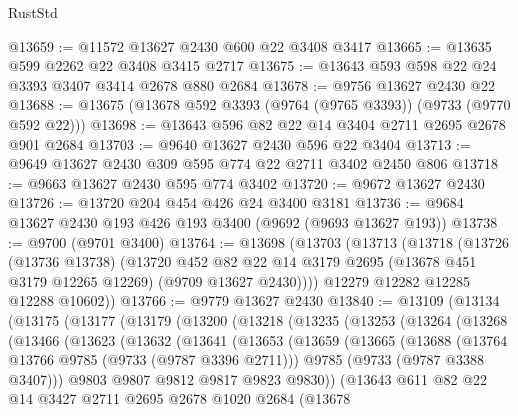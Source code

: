 \begin{lexlean}{RustStd}
\begin{coremodule}
{\begin{coremodule}
{{{{{{{{{{{{{{{{{{{{{{{{{{{{{{{{{{{{{{{{{{{{{{{{{{{{{{{@13659 := @11572 @13627 @2430 @600 @22 @3408 @3417
@13665 := @13635 @599 @2262 @22 @3408 @3415 @2717
@13675 := @13643 @593 @598 @22 @24 @3393 @3407 @3414 @2678 @880 @2684
@13678 := @9756 @13627 @2430 @22
@13688 := @13675 (@13678 @592 @3393 (@9764 (@9765 @3393)) (@9733 (@9770 @592 @22)))
@13698 := @13643 @596 @82 @22 @14 @3404 @2711 @2695 @2678 @901 @2684
@13703 := @9640 @13627 @2430 @596 @22 @3404
@13713 := @9649 @13627 @2430 @309 @595 @774 @22 @2711 @3402 @2450 @806
@13718 := @9663 @13627 @2430 @595 @774 @3402
@13720 := @9672 @13627 @2430
@13726 := @13720 @204 @454 @426 @24 @3400 @3181
@13736 := @9684 @13627 @2430 @193 @426 @193 @3400 (@9692 (@9693 @13627 @193))
@13738 := @9700 (@9701 @3400)
@13764 := @13698
    (@13703
      (@13713
        (@13718
          (@13726
            (@13736 @13738)
            (@13720
              @452
              @82
              @22
              @14
              @3179
              @2695
              (@13678 @451 @3179 @12265 @12269)
              (@9709 @13627 @2430))))
        @12279
        @12282
        @12285
        @12288
        @10602))
@13766 := @9779 @13627 @2430
@13840 := @13109
    (@13134
      (@13175
        (@13177
          (@13179
            (@13200
              (@13218
                (@13235
                  (@13253
                    (@13264
                      (@13268
                        (@13466
                          (@13623
                            (@13632
                              (@13641
                                (@13653
                                  (@13659
                                    (@13665
                                      (@13688
                                        (@13764 @13766 @9785 (@9733 (@9787 @3396 @2711)))
                                        @9785
                                        (@9733 (@9787 @3388 @3407)))
                                      @9803
                                      @9807
                                      @9812
                                      @9817
                                      @9823
                                      @9830))
                                  (@13643
                                    @611
                                    @82
                                    @22
                                    @14
                                    @3427
                                    @2711
                                    @2695
                                    @2678
                                    @1020
                                    @2684
                                    (@13678
}}}}}}}}}}}}}}}}}}}}}}}}}}}}}}}}}}}}}}}}}}}}}}}}}}}}}}}
\end{coremodule}}
\end{coremodule}
\end{lexlean}
